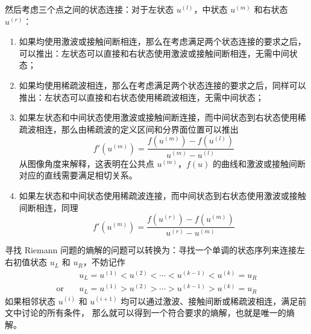 然后考虑三个点之间的状态连接：对于左状态 $u^{(l)}$，中状态 $u^{(m)}$ 和右状态 $u^{(r)}$：
\begin{enumerate}
    \item 如果均使用激波或接触间断相连，那么在考虑满足两个状态连接的要求之后，可以推出：左状态可以直接和右状态使用激波或接触间断相连，无需中间状态；
    \item 如果均使用稀疏波相连，那么在考虑满足两个状态连接的要求之后，同样可以推出：左状态可以直接和右状态使用稀疏波相连，无需中间状态；
    \item 如果左状态和中间状态使用激波或接触间断连接，而中间状态到右状态使用稀疏波相连，那么由稀疏波的定义区间和分界面位置可以推出
          \[
              f'(u^{(m)}) = \frac{f(u^{(m)}) - f(u^{(l)})}{u^{(m)} - u^{(l)}}
          \]
          从图像角度来解释，这表明在公共点 $u^{(m)}$，$f(u)$ 的曲线和激波或接触间断对应的直线需要满足相切关系。
    \item 如果左状态和中间状态使用稀疏波连接，而中间状态到右状态使用激波或接触间断相连，同理
          \[
              f'(u^{(m)}) = \frac{f(u^{(r)}) - f(u^{(m)})}{u^{(r)} - u^{(m)}}
          \]
\end{enumerate}

寻找 Riemann 问题的熵解的问题可以转换为：寻找一个单调的状态序列来连接左右初值状态 $u_L$ 和 $u_R$，不妨记作
\begin{align*}
                   & u_L = u^{(1)} < u^{(2)} < \cdots < u^{(k-1)} < u^{(k)} = u_R \\
    \text{or}\quad & u_L = u^{(1)} > u^{(2)} > \cdots > u^{(k-1)} > u^{(k)} = u_R
\end{align*}
如果相邻状态 $u^{(i)}$ 和 $u^{(i+1)}$ 均可以通过激波、接触间断或稀疏波相连，满足前文中讨论的所有条件，
那么就可以得到一个符合要求的熵解，也就是唯一的熵解。

